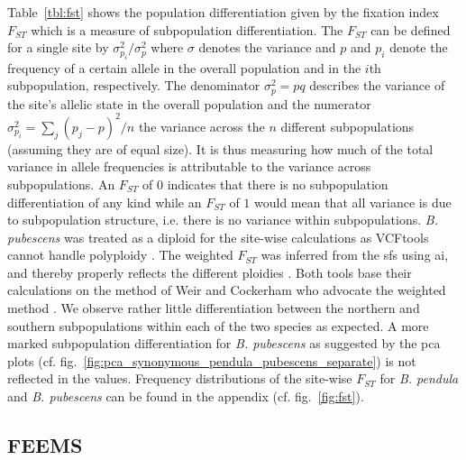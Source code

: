 \documentclass[hidelinks,11pt]{article}
\newcommand{\dadi}{\textdelta a\textdelta i}
\newcommand{\pendula}{\textit{B. pendula}}
\newcommand{\pubescens}{\textit{B. pubescens}}
\begin{document}
{    Table~\ref{tbl:fst} shows the population differentiation given by the fixation index $F_{ST}$ which is a measure of subpopulation differentiation. The $F_{ST}$ can be defined for a single site by $\sigma^2_{p_i}/\sigma^2_p$ where $\sigma$ denotes the variance and $p$ and $p_i$ denote the frequency of a certain allele in the overall population and in the $i$th subpopulation, respectively. The denominator $\sigma^2_p = pq$ describes the variance of the site's allelic state in the overall population and the numerator $\sigma^2_{p_i} = \sum_j (p_j - p)^2 / n$ the variance across the $n$ different subpopulations (assuming they are of equal size)\cite{gillespie}. It is thus measuring how much of the total variance in allele frequencies is attributable to the variance across subpopulations. An $F_{ST}$ of $0$ indicates that there is no subpopulation differentiation of any kind while an $F_{ST}$ of $1$ would mean that all variance is due to subpopulation structure, i.e. there is no variance within subpopulations. \pubescens{} was treated as a diploid for the site-wise calculations as VCFtools cannot handle polyploidy \cite{vcftools}. The weighted $F_{ST}$ was inferred from the \acrshort{sfs} using \dadi{}, and thereby properly reflects the different ploidies \cite{dadi}. Both tools base their calculations on the method of Weir and Cockerham who advocate the weighted method \cite{weir-cockerham}. We observe rather little differentiation between the northern and southern subpopulations within each of the two species as expected. A more marked subpopulation differentiation for \pubescens{} as suggested by the \acrshort{pca} plots (cf. fig.~\ref{fig:pca_synonymous_pendula_pubescens_separate}) is not reflected in the values. Frequency distributions of the site-wise $F_{ST}$ for \pendula{} and \pubescens{} can be found in the appendix (cf. fig.~\ref{fig:fst}).

    \subsection{FEEMS}
    \label{sec:feems}

}
\end{document}
